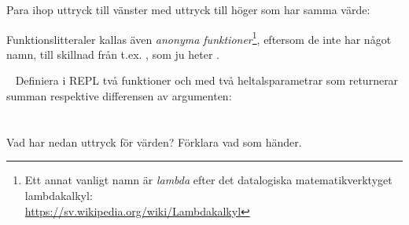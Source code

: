 Para ihop uttryck till vänster med uttryck till höger som har samma värde:

\begin{ConceptConnections}

\end{ConceptConnections}

\noindent
Funktionslitteraler kallas även \textit{anonyma funktioner}\footnote{Ett annat vanligt namn är \textit{lambda} efter det datalogiska matematikverktyget lambdakalkyl:  \\\url{https://sv.wikipedia.org/wiki/Lambdakalkyl}}, eftersom de inte har något namn, till skillnad från t.ex. , som ju heter .

\SOLUTION

\TaskSolved \what

\begin{ConceptConnections}
  
\end{ConceptConnections}

\QUESTEND




\ExtraTasks %




\QUESTBEGIN

\Task  \what~  Definiera i REPL två funktioner  och  med två heltalsparametrar som returnerar summan respektive differensen av argumenten: \\
 \\
 \\
Vad har nedan uttryck för värden? Förklara vad som händer.

\Subtask {}

\Subtask {}

\Subtask {}

\Subtask {}

\SOLUTION

\TaskSolved \what

\SubtaskSolved  {}

\SubtaskSolved  {}

\SubtaskSolved  {}

